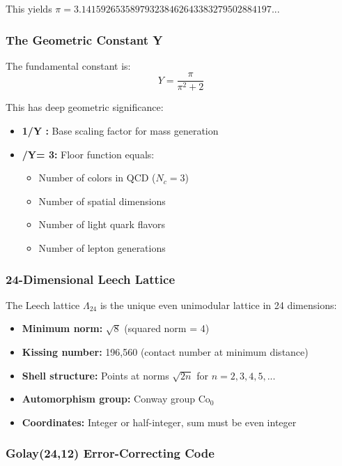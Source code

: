 \documentclass[11pt,twocolumn]{article}
\begin{document}
This yields $\pi = 3.141592653589793238462643383279502884197...$

\subsubsection{The Geometric Constant Y}

The fundamental constant is:
\begin{equation}
Y = \frac{\pi}{\pi^2 + 2}
\end{equation}

This has deep geometric significance:
\begin{itemize}
\item \textbf{1/Y  :} Base scaling factor for mass generation
\item \textbf{/Y\rfloor  = 3:} Floor function equals:
  \begin{itemize}
  \item Number of colors in QCD ($N_c = 3$)
  \item Number of spatial dimensions
  \item Number of light quark flavors
  \item Number of lepton generations
  \end{itemize}
\end{itemize}

\subsubsection{24-Dimensional Leech Lattice}

The Leech lattice $\Lambda_{24}$ is the unique even unimodular lattice in 24 dimensions:

\begin{itemize}
\item \textbf{Minimum norm:} $\sqrt{8}$ (squared norm = 4)
\item \textbf{Kissing number:} 196,560 (contact number at minimum distance)
\item \textbf{Shell structure:} Points at norms $\sqrt{2n}$ for $n = 2,3,4,5,...$
\item \textbf{Automorphism group:} Conway group $\text{Co}_0$
\item \textbf{Coordinates:} Integer or half-integer, sum must be even integer
\end{itemize}

\subsubsection{Golay(24,12) Error-Correcting Code}
\end{document}

